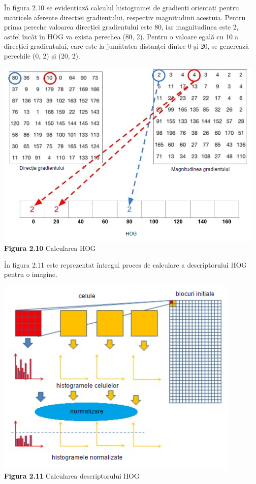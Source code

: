 \documentclass[a4paper,12pt]{report}
\newcommand\tab[1][1cm]{\hspace*{#1}}
\begin{document}
\tab În figura 2.10 se evidențiază calculul histogramei de gradienți orientați pentru matricele aferente direcției gradientului, respectiv magnitudinii acestuia. Pentru prima pereche valoarea direcției gradientului este 80, iar magnitudinea este 2, astfel încât în HOG va exista perechea (80, 2). Pentru o valoare egală cu 10 a direcției gradientului, care este la jumătatea distanței dintre 0 și 20, se generează perechile (0, 2) și (20, 2).
\begin {center} 
	\begin {footnotesize} 
		\includegraphics[width = 135mm]{fig2_10} \\
		\textbf  {Figura 2.10} Calcularea HOG
	\end {footnotesize} 
\end {center}
\tab În figura 2.11 este reprezentat întregul proces de calculare a descriptorului HOG pentru o imagine.
\begin {center} 
	\begin {footnotesize} 
		\includegraphics[width = 120mm]{fig2_11} \\
		\textbf  {Figura 2.11} Calcularea descriptorului HOG\cite{opencv4}
	\end {footnotesize} 
\end {center}
\end{document}
